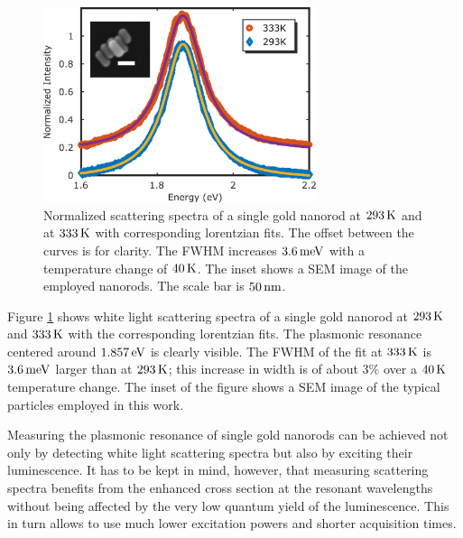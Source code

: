 \begin{figure}[htp] \centering
\includegraphics[width=8cm]{Chapters/05_WhiteLight/Figures/01_Spectra_Example/01_Spectra_Example.png}
\caption{Normalized scattering spectra of a single gold nanorod at $293\,\textrm{K}$ and
at $333\,\textrm{K}$ with corresponding lorentzian fits. The offset between the curves is for
clarity. The FWHM increases $3.6\,\textrm{meV}$ with a temperature change of $40\,\textrm{K}$. The
inset shows a SEM image of the employed nanorods. The scale bar is $50\,\textrm{nm}$.}
	\label{fig:spectra_rod}
\end{figure}

Figure \ref{fig:spectra_rod} shows white light scattering spectra of a single
gold nanorod at $293\,\textrm{K}$ and $333\,\textrm{K}$ with the corresponding lorentzian fits. The
plasmonic resonance centered around $1.857\,\textrm{eV}$ is clearly visible. The FWHM of
the fit at $333\,\textrm{K}$ is $3.6\,\textrm{meV}$ larger than at $293\,\textrm{K}$; this increase in width
is of about $3\%$ over a $40\,\textrm{K}$ temperature change. The inset of the figure
shows a SEM image of the typical particles employed in this work.

Measuring the plasmonic resonance of single gold nanorods can be achieved not
only by detecting white light scattering spectra but also by exciting their
luminescence\cite{Konrad2013}. It has to be kept in mind, however, that
measuring scattering spectra benefits from the enhanced cross section at the
resonant wavelengths without being affected by the very low quantum yield of the
luminescence\cite{Yorulmaz2012}. This in turn allows to use much lower
excitation powers and shorter acquisition times.

